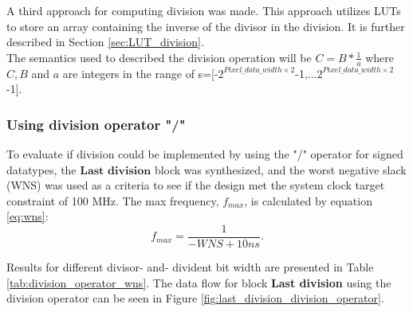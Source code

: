A third approach for computing division was made. This approach utilizes LUTs to store an array containing the inverse of the divisor in the division. It is further described in Section \ref{sec:LUT_division}.\\

 The semantics used to described the division operation will be $C=B*\frac{1}{a}$ where $C,B$ and $a$ are integers in the range of s=[-$2^{Pixel\_data\_width \times 2}$-1,...$2^{Pixel\_data\_width \times 2}$-1]. %


\subsubsection{Using division operator "/"}
\label{sec:division_operator}




To evaluate if division could be implemented by using the "/" operator for signed datatypes, the $\textbf{Last division}$ block was synthesized, and the worst negative slack (WNS) was used as a criteria to see if the design met the system clock target constraint of 100 MHz. 
The max frequency, $f_{max}$, is calculated by equation \ref{eq:wns}:  
\begin{equation}
f_{max}=\frac{1}{-WNS+10ns}. 
\label{eq:wns}
\end{equation}

 Results for different divisor- and- divident bit width are presented in Table \ref{tab:division_operator_wns}. The data flow for block \textbf{Last division} using the division operator can be seen in Figure \ref{fig:last_division_division_operator}.



